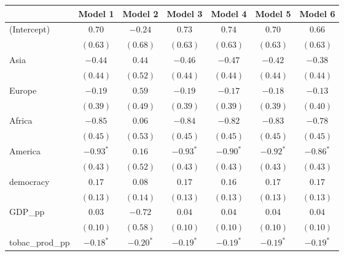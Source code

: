 
\begin{table}[!h]
\begin{center}
\begin{tabular}{l c c c c c c }
\toprule
 & Model 1 & Model 2 & Model 3 & Model 4 & Model 5 & Model 6 \\
\midrule
(Intercept)             & $0.70$       & $-0.24$      & $0.73$       & $0.74$       & $0.70$       & $0.66$       \\
                        & $(0.63)$     & $(0.68)$     & $(0.63)$     & $(0.63)$     & $(0.63)$     & $(0.63)$     \\
Asia                    & $-0.44$      & $0.44$       & $-0.46$      & $-0.47$      & $-0.42$      & $-0.38$      \\
                        & $(0.44)$     & $(0.52)$     & $(0.44)$     & $(0.44)$     & $(0.44)$     & $(0.44)$     \\
Europe                  & $-0.19$      & $0.59$       & $-0.19$      & $-0.17$      & $-0.18$      & $-0.13$      \\
                        & $(0.39)$     & $(0.49)$     & $(0.39)$     & $(0.39)$     & $(0.39)$     & $(0.40)$     \\
Africa                  & $-0.85$      & $0.06$       & $-0.84$      & $-0.82$      & $-0.83$      & $-0.78$      \\
                        & $(0.45)$     & $(0.53)$     & $(0.45)$     & $(0.45)$     & $(0.45)$     & $(0.45)$     \\
America                 & $-0.93^{*}$  & $0.16$       & $-0.93^{*}$  & $-0.90^{*}$  & $-0.92^{*}$  & $-0.86^{*}$  \\
                        & $(0.43)$     & $(0.52)$     & $(0.43)$     & $(0.43)$     & $(0.43)$     & $(0.43)$     \\
democracy               & $0.17$       & $0.08$       & $0.17$       & $0.16$       & $0.17$       & $0.17$       \\
                        & $(0.13)$     & $(0.14)$     & $(0.13)$     & $(0.13)$     & $(0.13)$     & $(0.13)$     \\
GDP\_pp                 & $0.03$       & $-0.72$      & $0.04$       & $0.04$       & $0.04$       & $0.04$       \\
                        & $(0.10)$     & $(0.58)$     & $(0.10)$     & $(0.10)$     & $(0.10)$     & $(0.10)$     \\
tobac\_prod\_pp         & $-0.18^{*}$  & $-0.20^{*}$  & $-0.19^{*}$  & $-0.19^{*}$  & $-0.19^{*}$  & $-0.19^{*}$  \\

\end{tabular}
\end{center}
\end{table}

